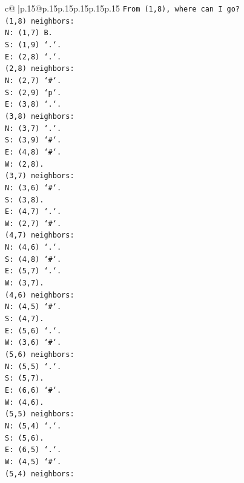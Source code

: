 \documentclass{article}
\begin{document}
{\begin{supertabular}{c@{$\;$}|p{.15\linewidth}@{}p{.15\linewidth}p{.15\linewidth}p{.15\linewidth}p{.15\linewidth}p{.15\linewidth}}
{{{\texttt{From (1,8), where can I go?} \\
\texttt{(1,8) neighbors:} \\
\texttt{N: (1,7) B.} \\
\texttt{S: (1,9) `.`.} \\
\texttt{E: (2,8) `.`.} \\
\texttt{(2,8) neighbors:} \\
\texttt{N: (2,7) `\#`.} \\
\texttt{S: (2,9) `p`.} \\
\texttt{E: (3,8) `.`.} \\
\texttt{(3,8) neighbors:} \\
\texttt{N: (3,7) `.`.} \\
\texttt{S: (3,9) `\#`.} \\
\texttt{E: (4,8) `\#`.} \\
\texttt{W: (2,8).} \\
\texttt{(3,7) neighbors:} \\
\texttt{N: (3,6) `\#`.} \\
\texttt{S: (3,8).} \\
\texttt{E: (4,7) `.`.} \\
\texttt{W: (2,7) `\#`.} \\
\texttt{(4,7) neighbors:} \\
\texttt{N: (4,6) `.`.} \\
\texttt{S: (4,8) `\#`.} \\
\texttt{E: (5,7) `.`.} \\
\texttt{W: (3,7).} \\
\texttt{(4,6) neighbors:} \\
\texttt{N: (4,5) `\#`.} \\
\texttt{S: (4,7).} \\
\texttt{E: (5,6) `.`.} \\
\texttt{W: (3,6) `\#`.} \\
\texttt{(5,6) neighbors:} \\
\texttt{N: (5,5) `.`.} \\
\texttt{S: (5,7).} \\
\texttt{E: (6,6) `\#`.} \\
\texttt{W: (4,6).} \\
\texttt{(5,5) neighbors:} \\
\texttt{N: (5,4) `.`.} \\
\texttt{S: (5,6).} \\
\texttt{E: (6,5) `.`.} \\
\texttt{W: (4,5) `\#`.} \\
\texttt{(5,4) neighbors:} \\
}}}
\end{supertabular}}
\end{document}
